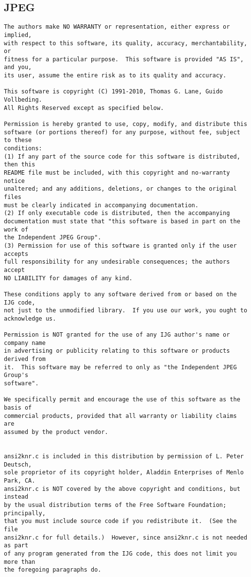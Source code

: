 \subsection{JPEG}
\begin{verbatim}
The authors make NO WARRANTY or representation, either express or implied,
with respect to this software, its quality, accuracy, merchantability, or
fitness for a particular purpose.  This software is provided "AS IS", and you,
its user, assume the entire risk as to its quality and accuracy.

This software is copyright (C) 1991-2010, Thomas G. Lane, Guido Vollbeding.
All Rights Reserved except as specified below.

Permission is hereby granted to use, copy, modify, and distribute this
software (or portions thereof) for any purpose, without fee, subject to these
conditions:
(1) If any part of the source code for this software is distributed, then this
README file must be included, with this copyright and no-warranty notice
unaltered; and any additions, deletions, or changes to the original files
must be clearly indicated in accompanying documentation.
(2) If only executable code is distributed, then the accompanying
documentation must state that "this software is based in part on the work of
the Independent JPEG Group".
(3) Permission for use of this software is granted only if the user accepts
full responsibility for any undesirable consequences; the authors accept
NO LIABILITY for damages of any kind.

These conditions apply to any software derived from or based on the IJG code,
not just to the unmodified library.  If you use our work, you ought to
acknowledge us.

Permission is NOT granted for the use of any IJG author's name or company name
in advertising or publicity relating to this software or products derived from
it.  This software may be referred to only as "the Independent JPEG Group's
software".

We specifically permit and encourage the use of this software as the basis of
commercial products, provided that all warranty or liability claims are
assumed by the product vendor.


ansi2knr.c is included in this distribution by permission of L. Peter Deutsch,
sole proprietor of its copyright holder, Aladdin Enterprises of Menlo Park, CA.
ansi2knr.c is NOT covered by the above copyright and conditions, but instead
by the usual distribution terms of the Free Software Foundation; principally,
that you must include source code if you redistribute it.  (See the file
ansi2knr.c for full details.)  However, since ansi2knr.c is not needed as part
of any program generated from the IJG code, this does not limit you more than
the foregoing paragraphs do.


\end{verbatim}
